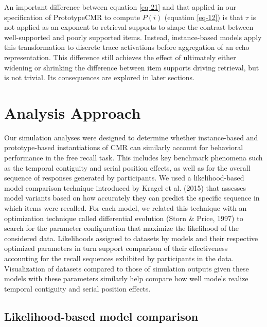 \documentclass[
  letterpaper,
  DIV=11]{article}
\begin{document}
An important difference between equation \ref{eq-21} and that applied in
our specification of PrototypeCMR to compute \(P(i)\) (equation
\ref{eq-12}) is that \(\tau\) is not applied as an exponent to retrieval
supports to shape the contrast between well-supported and poorly
supported items. Instead, instance-based models apply this
transformation to discrete trace activations before aggregation of an
echo representation. This difference still achieves the effect of
ultimately either widening or shrinking the difference between item
supports driving retrieval, but is not trivial. Its consequences are
explored in later sections.

\hypertarget{analysis-approach}{%
\section{Analysis Approach}\label{analysis-approach}}

Our simulation analyses were designed to determine whether
instance-based and prototype-based instantiations of CMR can similarly
account for behavioral performance in the free recall task. This
includes key benchmark phenomena such as the temporal contiguity and
serial position effects, as well as for the overall sequence of
responses generated by participants. We used a likelihood-based model
comparison technique introduced by Kragel et al. (2015) that assesses
model variants based on how accurately they can predict the specific
sequence in which items were recalled. For each model, we related this
technique with an optimization technique called differential evolution
(Storn \& Price, 1997) to search for the parameter configuration that
maximize the likelihood of the considered data. Likelihoods assigned to
datasets by models and their respective optimized parameters in turn
support comparison of their effectiveness accounting for the recall
sequences exhibited by participants in the data. Visualization of
datasets compared to those of simulation outputs given these models with
these parameters similarly help compare how well models realize temporal
contiguity and serial position effects.

\hypertarget{likelihood-based-model-comparison}{%
\subsection{Likelihood-based model
comparison}\label{likelihood-based-model-comparison}}
\end{document}
